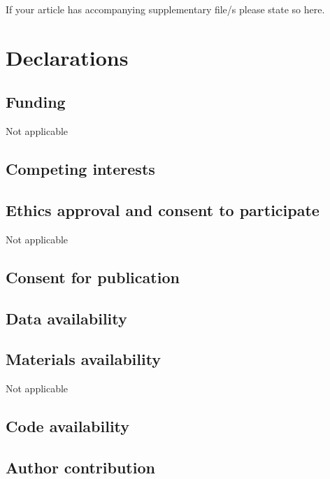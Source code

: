 \documentclass[pdflatex,sn-nature]{sn-jnl}%
\theoremstyle{thmstyleone}%
\theoremstyle{thmstyletwo}%
\theoremstyle{thmstylethree}%
\begin{document}
If your article has accompanying supplementary file/s please state so here.


\section*{Declarations}
\subsection*{Funding}
Not applicable

\subsection*{Competing interests}

\subsection*{Ethics approval and consent to participate}
Not applicable

\subsection*{Consent for publication}

\subsection*{Data availability}

\subsection*{Materials availability}
Not applicable

\subsection*{Code availability}

\subsection*{Author contribution}
\end{document}
